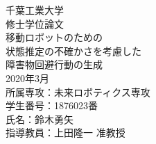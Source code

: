 \documentclass[a4paper,12pt,uplatex]{jsbook}
\begin{document}

\begin{titlepage}
  \begin{center}
      {\large
      千葉工業大学\\
      修士学位論文
      }\\ %
      \vspace{100truept}
      {\huge
      移動ロボットのための\\
      \huge
      状態推定の不確かさを考慮した\\
      \huge
      障害物回避行動の生成
      }\\ %
      \vspace{10truept}
      \vspace{150truept}
      {\large
      2020年3月
      }\\ %
      \vspace{50truept}
      {\large
      所属専攻：未来ロボティクス専攻
      }\\ %
      {\large
      学生番号：1876023番\\
      氏名：鈴木勇矢 
      }\\ %
      \vspace{50truept}
      {\large
      指導教員：上田隆一 准教授
      }\\ %
  \end{center}
\end{titlepage}
\end{document}
